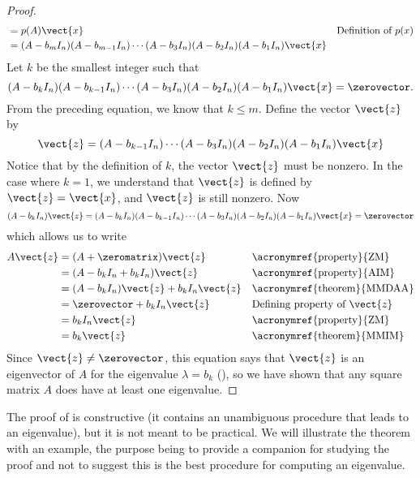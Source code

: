 \begin{proof}
\begin{align*}
&=p(A)\vect{x}&&\text{Definition of $p(x)$}\\
&=(A-b_mI_n)(A-b_{m-1}I_n)\cdots(A-b_3I_n)(A-b_2I_n)(A-b_1I_n)\vect{x}
\end{align*}
%
Let $k$ be the smallest integer such that 
%
\begin{equation*}
(A-b_kI_n)(A-b_{k-1}I_n)\cdots(A-b_3I_n)(A-b_2I_n)(A-b_1I_n)\vect{x}=\zerovector.
\end{equation*}
%
From the preceding equation, we know that $k\leq m$.  Define the vector $\vect{z}$ by
%
\begin{equation*}
\vect{z}=(A-b_{k-1}I_n)\cdots(A-b_3I_n)(A-b_2I_n)(A-b_1I_n)\vect{x}
\end{equation*}
%
Notice that by the definition of $k$, the vector $\vect{z}$ must be nonzero.  In the case where $k=1$, we understand that $\vect{z}$ is defined by $\vect{z}=\vect{x}$, and $\vect{z}$ is still nonzero.  Now
%
\begin{equation*}
(A-b_kI_n)\vect{z}=(A-b_kI_n)(A-b_{k-1}I_n)\cdots(A-b_3I_n)(A-b_2I_n)(A-b_1I_n)\vect{x}=\zerovector
\end{equation*}
%
which allows us to write 
%
\begin{align*}
A\vect{z}
&=(A+\zeromatrix)\vect{z}&&\text{\acronymref{property}{ZM}}\\
&=(A-b_kI_n+b_kI_n)\vect{z}&&\text{\acronymref{property}{AIM}}\\
&=(A-b_kI_n)\vect{z}+b_kI_n\vect{z}&&\text{\acronymref{theorem}{MMDAA}}\\
&=\zerovector+b_kI_n\vect{z}&&\text{Defining property of $\vect{z}$}\\
&=b_kI_n\vect{z}&&\text{\acronymref{property}{ZM}}\\
&=b_k\vect{z}&&\text{\acronymref{theorem}{MMIM}}
\end{align*}
%
Since $\vect{z}\neq\zerovector$, this equation says that $\vect{z}$ is an eigenvector of $A$ for the eigenvalue $\lambda=b_k$ (), so we have shown that any square matrix $A$ does have at least one eigenvalue.
%
\end{proof}
%
The proof of  is constructive (it contains an unambiguous procedure that leads to an eigenvalue), but it is not meant to be practical.  We will illustrate the theorem with an example, the purpose being to provide a companion for studying the proof and not to suggest this is the best procedure for computing an eigenvalue.  
%
